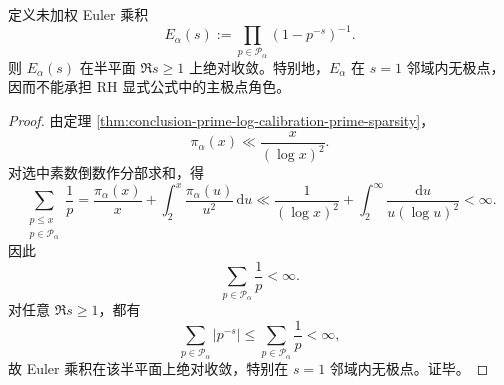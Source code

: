 \begin{corollary}\label{cor:conclusion-prime-log-unweighted-euler-not-rh-pole}
定义未加权 Euler 乘积
\[
E_\alpha(s):=
\prod_{p\in\mathcal P_\alpha}(1-p^{-s})^{-1}.
\]
则 \(E_\alpha(s)\) 在半平面 \(\Re s\ge 1\) 上绝对收敛。特别地，\(E_\alpha\) 在 \(s=1\) 邻域内无极点，因而不能承担 RH 显式公式中的主极点角色。
\end{corollary}
\begin{proof}
由定理 \ref{thm:conclusion-prime-log-calibration-prime-sparsity}，
\[
\pi_\alpha(x)\ll \frac{x}{(\log x)^2}.
\]
对选中素数倒数作分部求和，得
\[
\sum_{\substack{p\le x\\ p\in\mathcal P_\alpha}}\frac{1}{p}
=
\frac{\pi_\alpha(x)}{x}
+\int_{2}^{x}\frac{\pi_\alpha(u)}{u^2}\,\mathrm du
\ll
\frac{1}{(\log x)^2}
+\int_{2}^{\infty}\frac{\mathrm du}{u(\log u)^2}
<
\infty.
\]
因此
\[
\sum_{p\in\mathcal P_\alpha}\frac{1}{p}<\infty.
\]
对任意 \(\Re s\ge 1\)，都有
\[
\sum_{p\in\mathcal P_\alpha}|p^{-s}|
\le
\sum_{p\in\mathcal P_\alpha}\frac{1}{p}
<
\infty,
\]
故 Euler 乘积在该半平面上绝对收敛，特别在 \(s=1\) 邻域内无极点。证毕。
\end{proof}

